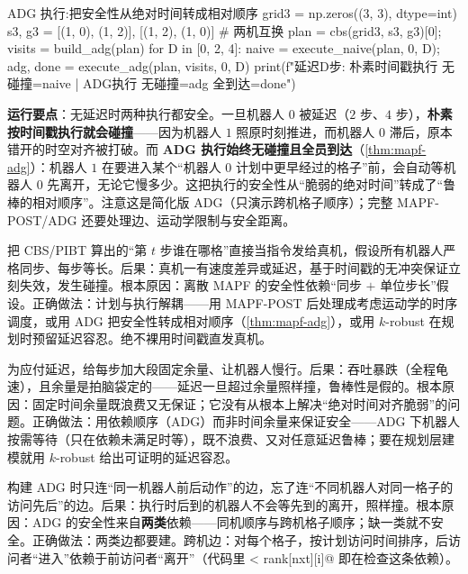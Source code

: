 \begin{codebox}[Python]{ADG 执行:把安全性从绝对时间转成相对顺序}
grid3 = np.zeros((3, 3), dtype=int)
s3, g3 = [(1, 0), (1, 2)], [(1, 2), (1, 0)]        # 两机互换
plan = cbs(grid3, s3, g3)[0]; visits = build_adg(plan)
for D in [0, 2, 4]:
    naive = execute_naive(plan, 0, D); adg, done = execute_adg(plan, visits, 0, D)
    print(f"延迟{D}步: 朴素时间戳执行 无碰撞={naive} | ADG执行 无碰撞={adg} 全到达={done}")
\end{codebox}

\textbf{运行要点}：无延迟时两种执行都安全。一旦机器人 $0$ 被延迟（$2$ 步、$4$ 步），\textbf{朴素按时间戳执行就会碰撞}——因为机器人 $1$ 照原时刻推进，而机器人 $0$ 滞后，原本错开的时空对齐被打破。而 \textbf{ADG 执行始终无碰撞且全员到达}（\cref{thm:mapf-adg}）：机器人 $1$ 在要进入某个“机器人 $0$ 计划中更早经过的格子”前，会自动等机器人 $0$ 先离开，无论它慢多少。这把执行的安全性从“脆弱的绝对时间”转成了“鲁棒的相对顺序”。注意这是简化版 ADG（只演示跨机格子顺序）；完整 MAPF-POST/ADG 还要处理边、运动学限制与安全距离。

\begin{pitfall}
把 CBS/PIBT 算出的“第 $t$ 步谁在哪格”直接当指令发给真机，假设所有机器人严格同步、每步等长。后果：真机一有速度差异或延迟，基于时间戳的无冲突保证立刻失效，发生碰撞。根本原因：离散 MAPF 的安全性依赖“同步 $+$ 单位步长”假设。正确做法：计划与执行解耦——用 MAPF-POST 后处理成考虑运动学的时序调度，或用 ADG 把安全性转成相对顺序（\cref{thm:mapf-adg}），或用 $k$-robust 在规划时预留延迟容忍。绝不裸用时间戳直发真机。
\end{pitfall}

\begin{pitfall}
为应付延迟，给每步加大段固定余量、让机器人慢行。后果：吞吐暴跌（全程龟速），且余量是拍脑袋定的——延迟一旦超过余量照样撞，鲁棒性是假的。根本原因：固定时间余量既浪费又无保证；它没有从根本上解决“绝对时间对齐脆弱”的问题。正确做法：用依赖顺序（ADG）而非时间余量来保证安全——ADG 下机器人按需等待（只在依赖未满足时等），既不浪费、又对任意延迟鲁棒；要在规划层建模就用 $k$-robust 给出可证明的延迟容忍。
\end{pitfall}

\begin{pitfall}
构建 ADG 时只连“同一机器人前后动作”的边，忘了连“不同机器人对同一格子的访问先后”的边。后果：执行时后到的机器人不会等先到的离开，照样撞。根本原因：ADG 的安全性来自\textbf{两类}依赖——同机顺序与跨机格子顺序；缺一类就不安全。正确做法：两类边都要建。跨机边：对每个格子，按计划访问时间排序，后访问者“进入”依赖于前访问者“离开”（代码里 \verb@left[nxt] < rank[nxt][i]@ 即在检查这条依赖）。
\end{pitfall}

